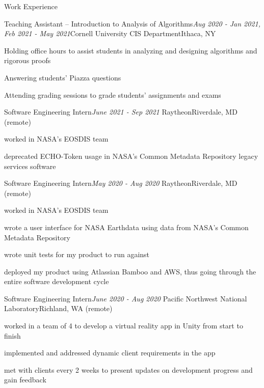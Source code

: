 \documentclass{resume} %
\begin{document}
\begin{rSection}{Work Experience}

\begin{rSubsection}{Teaching Assistant -- Introduction to Analysis of Algorithms}{\em Aug 2020 - Jan 2021, Feb 2021 - May 2021}{Cornell University CIS Department}{Ithaca, NY}
\item Holding office hours to assist students in analyzing and designing algorithms and rigorous proofs
\item Answering students' Piazza questions
\item Attending grading sessions to grade students' assignments and exams
\end{rSubsection}

\begin{rSubsection}{Software Engineering Intern}{\em June 2021 - Sep 2021 }{Raytheon}{Riverdale, MD (remote)}
\item worked in NASA's EOSDIS team
\item deprecated ECHO-Token usage in NASA's Common Metadata Repository legacy services software
\end{rSubsection}

\begin{rSubsection}{Software Engineering Intern}{\em May 2020 - Aug 2020 }{Raytheon}{Riverdale, MD (remote)}
\item worked in NASA's EOSDIS team
\item wrote a user interface for NASA Earthdata using data from NASA's Common Metadata Repository
\item wrote unit tests for my product to run against
\item deployed my product using Atlassian Bamboo and AWS, thus going through the entire software development cycle
\end{rSubsection}

\begin{rSubsection}{Software Engineering Intern}{\em June 2020 - Aug 2020 }{Pacific Northwest National Laboratory}{Richland, WA (remote)}
\item worked in a team of 4 to develop a virtual reality app in Unity from start to finish
\item implemented and addressed dynamic client requirements in the app
\item met with clients every 2 weeks to present updates on development progress and gain feedback
\end{rSubsection}


\end{rSection}
\end{document}
